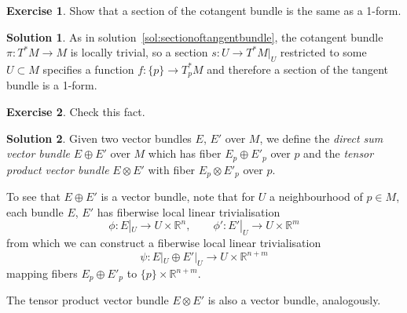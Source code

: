 \documentclass[11pt, a4paper]{report}
\theoremstyle{definition}
\newtheorem{exercise}{Exercise}[part]
\newtheorem{solution}{Solution}[part]
\newenvironment{ex}{\begin{exercise}}{\end{exercise}\pagebreak[1]}
\newenvironment{sol}{\begin{solution}}{\end{solution}\pagebreak[3]}
\begin{document}
\begin{ex}

Show that a section of the cotangent bundle is the same as a 1-form.

\end{ex}

\begin{sol}

As in solution~\ref{sol:sectionoftangentbundle}, the cotangent bundle $\pi: T^*M \to M$ is locally trivial, so a section $s: U \to T^*M|_U$ restricted to some $U \subset M$ specifies a function $f: \{p\} \to T^*_p M$ and therefore a section of the tangent bundle is a 1-form.

\end{sol}

\begin{ex}

Check this fact.

\end{ex}

\begin{sol}

Given two vector bundles $E$, $E'$ over $M$, we define the \emph{direct sum vector bundle} $E \oplus E'$ over $M$ which has fiber $E_p \oplus E'_p$ over $p$ and the \emph{tensor product vector bundle} $E \otimes E'$ with fiber $E_p \otimes E'_p$ over $p$.

To see that $E \oplus E'$ is a vector bundle, note that for $U$ a neighbourhood of $p \in M$, each bundle $E$, $E'$ has fiberwise local linear trivialisation
\[
    \phi: E|_U \to U \times \mathbb{R}^n, \qquad
    \phi': E'|_U \to U \times \mathbb{R}^m
\]
from which we can construct a fiberwise local linear trivialisation
\[
    \psi: E|_U \oplus E'|_U \to U \times \mathbb{R}^{n + m}
\]
mapping fibers $E_p \oplus E'_p$ to $\{p\} \times \mathbb{R}^{n + m}$.

The tensor product vector bundle $E \otimes E'$ is also a vector bundle, analogously.

\end{sol}
\end{document}
